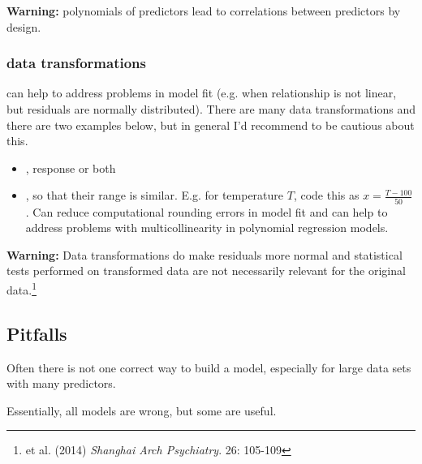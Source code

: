 \textbf{Warning:} polynomials of predictors lead to correlations between predictors by design.

\subsubsection{data transformations}

 can help to address problems in model fit (e.g. when relationship is not linear, but residuals are normally distributed). There are many data transformations and there are two examples below, but in general I'd recommend to be cautious about this.
\begin{itemize}
	\item {}, response or both
	\item {}, so that their range is similar. E.g. for temperature $T$, code this as $x=\frac{T-100}{50}$. Can reduce computational rounding errors in model fit and can help to address problems with multicollinearity in polynomial regression models.
\end{itemize}

\textbf{Warning:} Data transformations do make residuals more normal and statistical tests performed on transformed data are not necessarily relevant for the original data.\footnote{ et al. (2014) \textit{Shanghai Arch Psychiatry}. 26: 105-109}

\subsection{Pitfalls}

Often there is not one correct way to build a model, especially for large data sets with many predictors.

\begin{proposition}
	Essentially, all models are wrong, but some are useful.
\end{proposition} 

